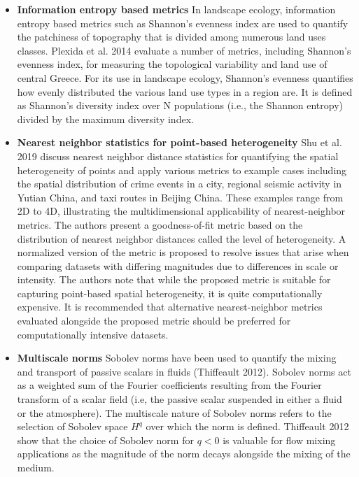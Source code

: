 \begin{itemize}
\item {\bf Information entropy based metrics} In landscape ecology, information entropy based metrics such as Shannon’s evenness index are used to quantify the patchiness of topography that is divided among numerous land uses classes. Plexida et al. 2014 evaluate a number of metrics, including Shannon’s evenness index, for measuring the topological variability and land use of central Greece. For its use in landscape ecology, Shannon’s evenness quantifies how evenly distributed the various land use types in a region are. It is defined as Shannon’s diversity index over N populations (i.e., the Shannon entropy) divided by the maximum diversity index. 
\item {\bf Nearest neighbor statistics for point-based heterogeneity} Shu et al. 2019 discuss nearest neighbor distance statistics for quantifying the spatial heterogeneity of points and apply various metrics to example cases including the spatial distribution of crime events in a city, regional seismic activity in Yutian China, and taxi routes in Beijing China. These examples range from 2D to 4D, illustrating the multidimensional applicability of nearest-neighbor metrics. The authors present a goodness-of-fit metric based on the distribution of nearest neighbor distances called the level of heterogeneity. A normalized version of the metric is proposed to resolve issues that arise when comparing datasets with differing magnitudes due to differences in scale or intensity. The authors note that while the proposed metric is suitable for capturing point-based spatial heterogeneity, it is quite computationally expensive. It is recommended that alternative nearest-neighbor metrics evaluated alongside the proposed metric should be preferred for computationally intensive datasets. 
\item {\bf Multiscale norms} Sobolev norms have been used to quantify the mixing and transport of passive scalars in fluids (Thiffeault 2012). Sobolev norms act as a weighted sum of the Fourier coefficients resulting from the Fourier transform of a scalar field (i.e, the passive scalar suspended in either a fluid or the atmosphere). The multiscale nature of Sobolev norms refers to the selection of Sobolev space $H^q$ over which the norm is defined. Thiffeault 2012 show that the choice of Sobolev norm for $q<0$ is valuable for flow mixing applications as the magnitude of the norm decays alongside the mixing of the medium.
\end{itemize}

